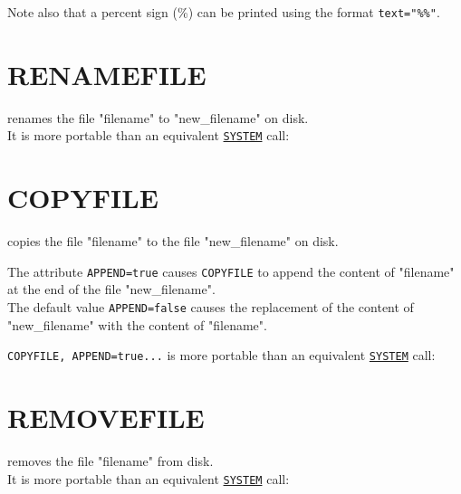 Note also that a percent sign (\%) can be printed using the format
\verb|text="%%"|. 


\section{RENAMEFILE}
\label{sec:renamefile}
renames the file "filename" to "new\_filename" on disk. \\
It is more portable than an equivalent \hyperref[sec:system]{\tt SYSTEM} call:

\section{COPYFILE}
\label{sec:copyfile}
copies the file "filename" to the file "new\_filename" on disk.

The attribute {\tt APPEND=true} causes {\tt COPYFILE} to append the content of 
"filename" at the end of the file "new\_filename".\\
The default value {\tt APPEND=false} causes the 
replacement of the content of "new\_filename" with the content of "filename".

{\tt COPYFILE, APPEND=true...} is more portable than an equivalent \hyperref[sec:system]{\tt SYSTEM} call:

\section{REMOVEFILE}
\label{sec:removefile}
removes the file "filename" from disk. \\
It is more portable than an equivalent \hyperref[sec:system]{\tt SYSTEM} call: 



